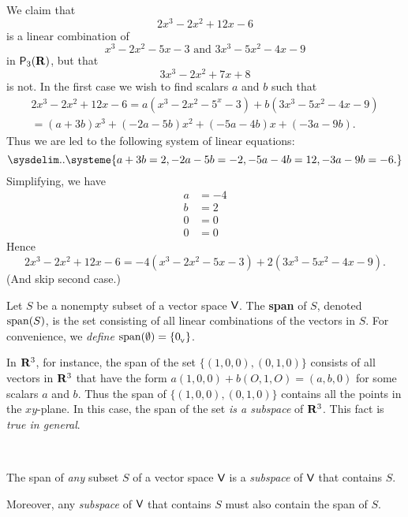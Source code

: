 \begin{example} \label{example 1.4.2}
We claim that
\[
    2x^3 - 2x^2 + 12x - 6
\]
is a linear combination of
\[
    x^3 - 2x^2 - 5x - 3 \text{ and } 3x^3 - 5x^2 - 4x - 9
\]
in \(\textsf{P}_3(\mathbf{R})\), but that
\[
    3x^3 - 2x^2 + 7x + 8
\]
is not.
In the first case we wish to find scalars \(a\) and \(b\) such that
\begin{align*}
    2x^3 - 2x^2 + 12x - 6 = a(x^3 - 2x^2 - 5^x - 3) + b(3x^3 - 5x^2 - 4x - 9) \\
    = (a + 3b)x^3 + (-2a - 5b)x^2 + (-5a - 4b)x + (-3a - 9b).
\end{align*}
Thus we are led to the following system of linear equations:
\begin{equation*}
\sysdelim..\systeme{
      a + 3b = 2,
    -2a - 5b = -2,
    -5a - 4b = 12,
    -3a - 9b = -6.}
\end{equation*}
Simplifying, we have
\begin{align*}
    a & = -4 \\
    b & = 2 \\
    0 & = 0 \\
    0 & = 0
\end{align*}
Hence
\[
    2x^3 - 2x^2 + 12x - 6 = -4(x^3 - 2x^2 - 5x - 3) + 2(3x^3 - 5x^2 - 4x - 9).
\]
(And skip second case.)
\end{example}

\begin{definition} \label{def 1.4}
Let \(S\) be a nonempty subset of a vector space \(\textsf{V}\).
The \textbf{span} of \(S\), denoted \(\operatorname{span}(S)\), is the set consisting of all linear combinations of the vectors in \(S\).
For convenience, we \emph{define} \(\operatorname{span}(\emptyset) = \{ 0_{_{\textsf{V}}} \}\).
\end{definition}

In \(\mathbf{R}^3\), for instance, the span of the set \(\{ (1,0,0), (0, 1,0) \}\) consists of all vectors in \(\mathbf{R}^3\) that have the form \(a(1, 0, 0) + b(O, 1, O) = (a, b, 0)\) for some scalars \(a\) and \(b\).
Thus the span of \(\{ (1, 0, 0), (0, 1, 0) \}\) contains all the points in the \(xy\)-plane.
In this case, the span of the set \emph{is a subspace} of \(\mathbf{R}^3\). This fact is \emph{true in general}.

\begin{theorem} \label{thm 1.5}\ 

 The span of \emph{any} subset \(S\) of a vector space \(\textsf{V}\) is a \emph{subspace} of \(\textsf{V}\) that contains \(S\).

 Moreover, any \emph{subspace} of \(\textsf{V}\) that contains \(S\) must also contain the span of \(S\).
\end{theorem}

